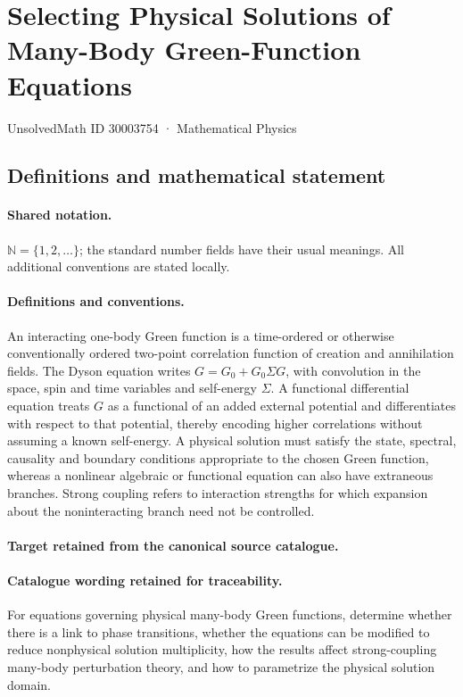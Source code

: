 \documentclass[11pt]{article}
\begin{document}
\setcounter{section}{30003753}
\section{Selecting Physical Solutions of Many-Body Green-Function Equations}\label{30003754}
{\small UnsolvedMath ID 30003754 · Mathematical Physics}
\subsection{Definitions and mathematical statement}

\paragraph{Shared notation.}$\mathbb N=\{1,2,\ldots\}$; the standard number fields have their usual meanings. All additional conventions are stated locally.


\paragraph{Definitions and conventions.}
An interacting one-body Green function is a time-ordered or otherwise conventionally ordered two-point correlation function of creation and annihilation fields. The Dyson equation writes $G=G_0+G_0\Sigma G$, with convolution in the space, spin and time variables and self-energy $\Sigma$. A functional differential equation treats $G$ as a functional of an added external potential and differentiates with respect to that potential, thereby encoding higher correlations without assuming a known self-energy. A physical solution must satisfy the state, spectral, causality and boundary conditions appropriate to the chosen Green function, whereas a nonlinear algebraic or functional equation can also have extraneous branches. Strong coupling refers to interaction strengths for which expansion about the noninteracting branch need not be controlled.

\paragraph{Target retained from the canonical source catalogue.}
\paragraph{Catalogue wording retained for traceability.}
For equations governing physical many-body Green functions, determine whether there is a link to phase transitions, whether the equations can be modified to reduce nonphysical solution multiplicity, how the results affect strong-coupling many-body perturbation theory, and how to parametrize the physical solution domain.
\end{document}
